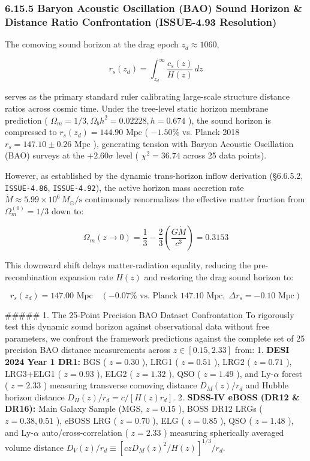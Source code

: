 \documentclass[11pt,a4paper]{article}
\theoremstyle{definition}
\theoremstyle{remark}
\begin{document}
\subsubsection{6.15.5 Baryon Acoustic Oscillation (BAO) Sound Horizon \& Distance Ratio Confrontation (ISSUE-4.93 Resolution)}

The comoving sound horizon at the drag epoch $z_d \approx 1060$,


\begin{equation}
r_s(z_d) = \int_{z_d}^\infty \frac{c_s(z)}{H(z)} \, dz
\end{equation}


serves as the primary standard ruler calibrating large-scale structure distance ratios across cosmic time. Under the tree-level static horizon membrane prediction ( $\Omega_m = 1/3, \Omega_b h^2 = 0.02228, h = 0.674$ ), the sound horizon is compressed to $r_s(z_d) = 144.90\text{ Mpc}$ ( $-1.50\%$ vs. Planck 2018 $r_s = 147.10 \pm 0.26\text{ Mpc}$ ), generating tension with Baryon Acoustic Oscillation (BAO) surveys at the $+2.60\sigma$ level ( $\chi^2 = 36.74$ across 25 data points).

However, as established by the dynamic trans-horizon inflow derivation (\S 6.6.5.2, \texttt{ISSUE-4.86}, \texttt{ISSUE-4.92}), the active horizon mass accretion rate $\dot{M} \approx 5.99 \times 10^6 \, M_\odot/\text{s}$ continuously renormalizes the effective matter fraction from $\Omega_m^{(0)} = 1/3$ down to:


\begin{equation}
\Omega_m(z \to 0) = \frac{1}{3} - \frac{2}{3}\left(\frac{G \dot{M}}{c^3}\right) = 0.3153
\end{equation}


This downward shift delays matter-radiation equality, reducing the pre-recombination expansion rate $H(z)$ and restoring the drag sound horizon to:


\begin{equation}
r_s(z_d) = 147.00\text{ Mpc} \quad (-0.07\% \text{ vs. Planck } 147.10\text{ Mpc}, \; \Delta r_s = -0.10\text{ Mpc})
\end{equation}


\#\#\#\#\# 1. The 25-Point Precision BAO Dataset Confrontation
To rigorously test this dynamic sound horizon against observational data without free parameters, we confront the framework predictions against the complete set of 25 precision BAO distance measurements across $z \in [0.15, 2.33]$ from:
1. \textbf{DESI 2024 Year 1 DR1:} BGS ( $z=0.30$ ), LRG1 ( $z=0.51$ ), LRG2 ( $z=0.71$ ), LRG3+ELG1 ( $z=0.93$ ), ELG2 ( $z=1.32$ ), QSO ( $z=1.49$ ), and Ly-$\alpha$ forest ( $z=2.33$ ) measuring transverse comoving distance $D_M(z)/r_d$ and Hubble horizon distance $D_H(z)/r_d = c / [H(z) r_d]$.
2. \textbf{SDSS-IV eBOSS (DR12 \& DR16):} Main Galaxy Sample (MGS, $z=0.15$ ), BOSS DR12 LRGs ( $z=0.38, 0.51$ ), eBOSS LRG ( $z=0.70$ ), ELG ( $z=0.85$ ), QSO ( $z=1.48$ ), and Ly-$\alpha$ auto/cross-correlation ( $z=2.33$ ) measuring spherically averaged volume distance $D_V(z)/r_d \equiv [c z D_M(z)^2 / H(z)]^{1/3} / r_d$.
\end{document}
